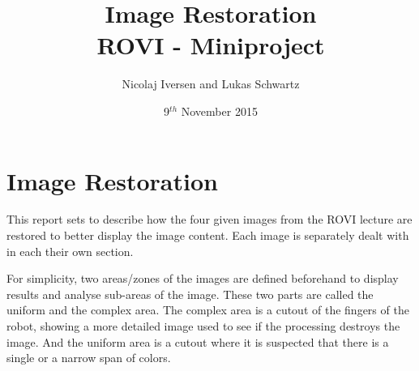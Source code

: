 \documentclass[12pt,a4paper,conference]{IEEEtran}
\begin{document}
\raggedbottom

\title{Image Restoration\\ \large{ROVI - Miniproject}}
\author{Nicolaj Iversen and Lukas Schwartz}
\date{9$^{th}$ November 2015}

\maketitle

\section{Image Restoration}
This report sets to describe how the four given images from the ROVI lecture are restored to better display the image content.
Each image is separately dealt with in each their own section.

For simplicity, two areas/zones of the images are defined beforehand to display results and analyse sub-areas of the image.
These two parts are called the uniform and the complex area.
The complex area is a cutout of the fingers of the robot, showing a more detailed image used to see if the processing destroys the image.
And the uniform area is a cutout where it is suspected that there is a single or a narrow span of colors.










\end{document}
